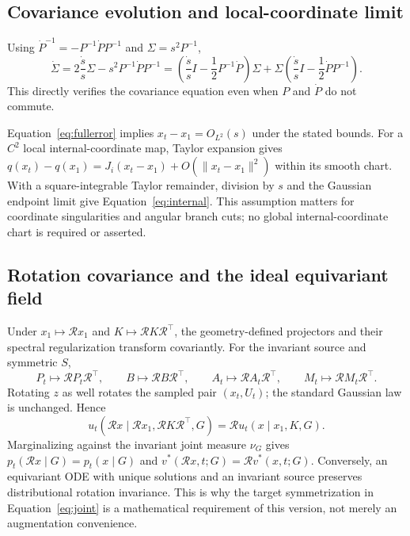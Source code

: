 \documentclass[11pt,letterpaper]{article}
\begin{document}
\subsection{Covariance evolution and local-coordinate limit}
Using $\dot P^{-1}=-P^{-1}\dot PP^{-1}$ and $\Sigma=s^2P^{-1}$,
\begin{equation}\label{eq:covproof}
\dot\Sigma=2\frac{\dot s}{s}\Sigma-s^2P^{-1}\dot PP^{-1}
=\left(\frac{\dot s}{s}I-\frac12P^{-1}\dot P\right)\Sigma
+\Sigma\left(\frac{\dot s}{s}I-\frac12\dot PP^{-1}\right).
\end{equation}
This directly verifies the covariance equation even when $P$ and $\dot P$ do not commute.

Equation~\eqref{eq:fullerror} implies $x_t-x_1=O_{L^2}(s)$ under the stated bounds. For a $C^2$ local internal-coordinate map, Taylor expansion gives
$q(x_t)-q(x_1)=J_i(x_t-x_1)+O(\|x_t-x_1\|^2)$ within its smooth chart. With a square-integrable Taylor remainder, division by $s$ and the Gaussian endpoint limit give Equation~\eqref{eq:internal}. This assumption matters for coordinate singularities and angular branch cuts; no global internal-coordinate chart is required or asserted.

\subsection{Rotation covariance and the ideal equivariant field}\label{app:symmetry}
Under $x_1\mapsto\mathcal Rx_1$ and $K\mapsto\mathcal R K\mathcal R^\top$, the geometry-defined projectors and their spectral regularization transform covariantly. For the invariant source and symmetric $S$,
\begin{equation}\label{eq:rotidentities}
P_t\mapsto\mathcal RP_t\mathcal R^\top,\qquad
B\mapsto\mathcal RB\mathcal R^\top,\qquad
A_t\mapsto\mathcal RA_t\mathcal R^\top,\qquad
M_t\mapsto\mathcal RM_t\mathcal R^\top.
\end{equation}
Rotating $z$ as well rotates the sampled pair $(x_t,U_t)$; the standard Gaussian law is unchanged. Hence
\begin{equation}\label{eq:condsymmetry}
u_t(\mathcal Rx\mid\mathcal Rx_1,\mathcal RK\mathcal R^\top,G)
=\mathcal Ru_t(x\mid x_1,K,G).
\end{equation}
Marginalizing against the invariant joint measure $\nu_G$ gives
$p_t(\mathcal Rx\mid G)=p_t(x\mid G)$ and
$v^*(\mathcal Rx,t;G)=\mathcal Rv^*(x,t;G)$.
Conversely, an equivariant ODE with unique solutions and an invariant source preserves distributional rotation invariance. This is why the target symmetrization in Equation~\eqref{eq:joint} is a mathematical requirement of this version, not merely an augmentation convenience.
\end{document}

